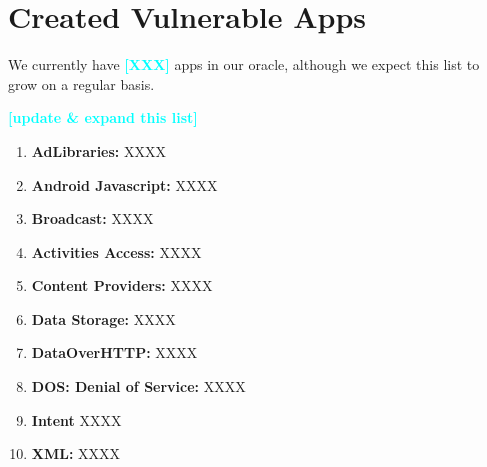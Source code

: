 \documentclass{sig-alternate-05-2015}
\newcommand{\todo}[1]{\textcolor{cyan}{\textbf{[#1]}}}
\begin{document}
\section{Created Vulnerable Apps}
\label{sec:vulnerableApps}




We currently have \todo{XXX} apps in our oracle, although we expect this list to grow on a regular basis.


\todo{update \& expand this list}



\begin{enumerate} 
   
   
   



	\item \textbf{AdLibraries: }XXXX


	\item \textbf{Android Javascript: }XXXX




	\item \textbf{Broadcast: } XXXX



	\item \textbf{Activities Access: } XXXX

	\item \textbf{Content Providers: } XXXX


	\item \textbf{Data Storage: } XXXX

	\item \textbf{DataOverHTTP: } XXXX


	\item \textbf{DOS: Denial of Service:} XXXX

	\item \textbf{Intent} XXXX

	\item \textbf{XML:} XXXX 




\end{enumerate}
\end{document}

